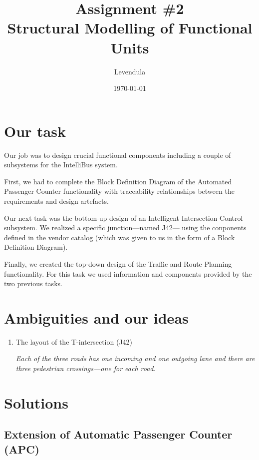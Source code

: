 \documentclass[a4paper,draft]{article}
\title{Assignment \#2 \\ Structural Modelling of Functional Units}
\author{Levendula}
\date{\today}
\begin{document}


\tableofcontents
\listoffigures
\clearpage

\section{Our task}

Our job was to design crucial functional components including a couple of
subsystems for the IntelliBus system.

First, we had to complete the Block Definition Diagram of the {Automated
Passenger Counter} functionality with traceability relationships between
the requirements and design artefacts.

Our next task was the bottom-up design of an {Intelligent Intersection Control}
subsystem. We realized a specific junction—named J42— using the conponents
defined in the vendor catalog (which was given to us in the form of a Block
Definition Diagram).

Finally, we created the top-down
design of the {Traffic and Route Planning} functionality. For this task we used
information and components provided by the two previous tasks.



\section{Ambiguities and our ideas}

\begin{enumerate}
	\item The layout of the T-intersection (J42)

		\textit{Each of the three roads has one incoming and one
			outgoing lane and there are three pedestrian
			crossings—one for each road.}
\end{enumerate}


\section{Solutions}

\subsection{Extension of Automatic Passenger Counter (APC)}
\end{document}
